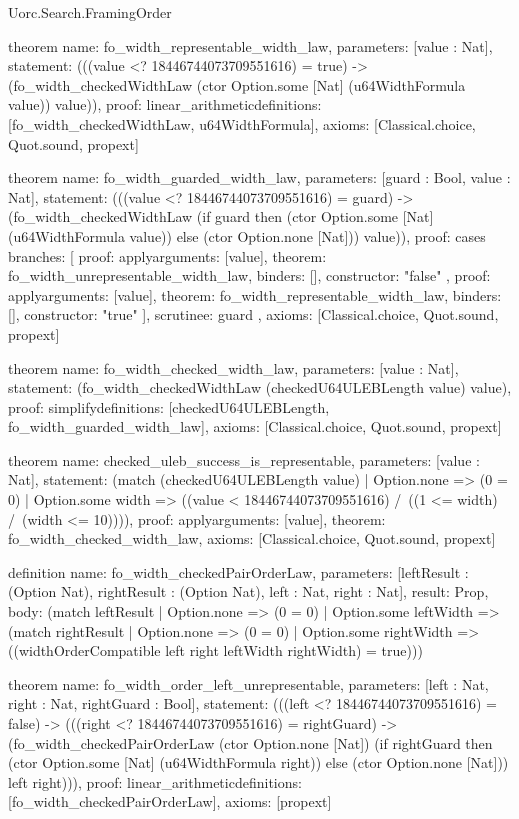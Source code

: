 \begin{lexlean}{Uorc.Search.FramingOrder}
\begin{semanticmodule}
theorem{
  name: fo_width_representable_width_law,
  parameters: [value : Nat],
  statement: (((value <? 18446744073709551616) = true) -> (fo_width_checkedWidthLaw (ctor Option.some [Nat] (u64WidthFormula value)) value)),
  proof: linear_arithmetic{definitions: [fo_width_checkedWidthLaw, u64WidthFormula]},
  axioms: [Classical.choice, Quot.sound, propext]
}

theorem{
  name: fo_width_guarded_width_law,
  parameters: [guard : Bool, value : Nat],
  statement: (((value <? 18446744073709551616) = guard) -> (fo_width_checkedWidthLaw (if guard then (ctor Option.some [Nat] (u64WidthFormula value)) else (ctor Option.none [Nat])) value)),
  proof: cases{
    branches: [
      {
        proof: apply{arguments: [value], theorem: fo_width_unrepresentable_width_law},
        binders: [],
        constructor: "false"
      },
      {
        proof: apply{arguments: [value], theorem: fo_width_representable_width_law},
        binders: [],
        constructor: "true"
      }
    ],
    scrutinee: guard
  },
  axioms: [Classical.choice, Quot.sound, propext]
}

theorem{
  name: fo_width_checked_width_law,
  parameters: [value : Nat],
  statement: (fo_width_checkedWidthLaw (checkedU64ULEBLength value) value),
  proof: simplify{definitions: [checkedU64ULEBLength, fo_width_guarded_width_law]},
  axioms: [Classical.choice, Quot.sound, propext]
}

theorem{
  name: checked_uleb_success_is_representable,
  parameters: [value : Nat],
  statement: (match (checkedU64ULEBLength value)
    | Option.none => (0 = 0)
    | Option.some width => ((value < 18446744073709551616) /\ ((1 <= width) /\ (width <= 10)))),
  proof: apply{arguments: [value], theorem: fo_width_checked_width_law},
  axioms: [Classical.choice, Quot.sound, propext]
}

definition{
  name: fo_width_checkedPairOrderLaw,
  parameters: [leftResult : (Option Nat), rightResult : (Option Nat), left : Nat, right : Nat],
  result: Prop,
  body: (match leftResult
    | Option.none => (0 = 0)
    | Option.some leftWidth => (match rightResult
      | Option.none => (0 = 0)
      | Option.some rightWidth => ((widthOrderCompatible left right leftWidth rightWidth) = true)))
}

theorem{
  name: fo_width_order_left_unrepresentable,
  parameters: [left : Nat, right : Nat, rightGuard : Bool],
  statement: (((left <? 18446744073709551616) = false) -> (((right <? 18446744073709551616) = rightGuard) -> (fo_width_checkedPairOrderLaw (ctor Option.none [Nat]) (if rightGuard then (ctor Option.some [Nat] (u64WidthFormula right)) else (ctor Option.none [Nat])) left right))),
  proof: linear_arithmetic{definitions: [fo_width_checkedPairOrderLaw]},
  axioms: [propext]
}


\end{semanticmodule}
\end{lexlean}
